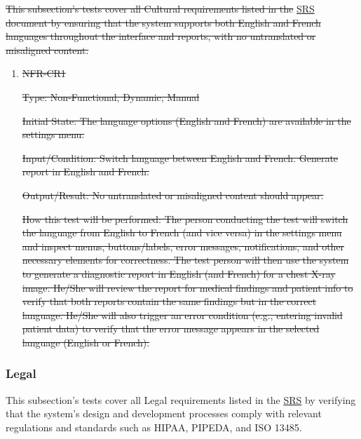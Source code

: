 \documentclass[12pt, titlepage]{article}
\begin{document}
\sout{This subsection's tests cover all Cultural requirements listed in the }
\href{https://github.com/RezaJodeiri/CXR-Capstone/blob/main/docs/SRS/SRS.pdf}{SRS} \citep{SRS}
\sout{ document by ensuring that the system supports both English and French languages throughout the interface and reports, with no untranslated or misaligned content.}

\begin{enumerate}

\item{\sout{NFR-CR1}\\}\label{NFR-CR1}

\sout{Type: Non-Functional, Dynamic, Manual}

\sout{Initial State: The language options (English and French) are available in the settings menu.}

\sout{Input/Condition: Switch language between English and French. Generate report in English and French.}

\sout{Output/Result: No untranslated or misaligned content should appear.}

\sout{How this test will be performed: The person conducting the test will switch the language from English to French (and vice versa) in the settings menu and inspect menus, buttons/labels, error messages, notifications, and other necessary elements for correctness. The test person will then use the system to generate a diagnostic report in English (and French) for a chest X-ray image. He/She will review the report for medical findings and patient info to verify that both reports contain the same findings but in the correct language. He/She will also trigger an error condition (e.g., entering invalid patient data) to verify that the error message appears in the selected language (English or French).}

\end{enumerate}



\subsubsection{Legal}

This subsection's tests cover all Legal requirements listed in the \href{https://github.com/RezaJodeiri/CXR-Capstone/blob/main/docs/SRS/SRS.pdf}{SRS} \citep{SRS}
 by verifying that the system's design and development processes comply with relevant regulations and standards such as HIPAA, PIPEDA, and ISO 13485.
\end{document}
